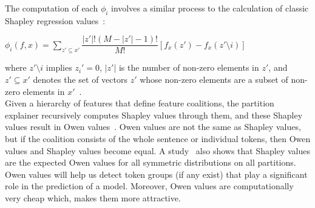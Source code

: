 The computation of each $\phi_i$ involves a similar process to the calculation of classic Shapley regression values~\parencite{AnalysisOfRegressionInGameTheory_Lipovetsky}:
\begin{center}
    $\phi_i(f, x ) = \sum\limits_{z' \subseteq x'} \dfrac{|z'|! (M - |z'| - 1)!}{M!} [f_x(z') - f_x(z' \setminus i)]$
\end{center}
where $z' \setminus i$ implies $z_i' = 0$, $|z'|$ is the number of non-zero elements in $z'$, and $z' \subseteq x'$ denotes the set of vectors $z'$ whose non-zero elements are a subset of non-zero elements in $x'$~\parencite{AUnifiedApproach_Lundberg}.\\
Given a hierarchy of features that define feature coalitions, the partition explainer recursively computes Shapley values through them, and these Shapley values result in Owen values~\parencite{OwenValues_Owen}. Owen values are not the same as Shapley values, but if the coalition consists of the whole sentence or individual tokens, then Owen values and Shapley values become equal. A study~\parencite{TheOwenAndShapleyValue_Casajus} also shows that Shapley values are the expected Owen values for all symmetric distributions on all partitions. Owen values will help us detect token groups (if any exist) that play a significant role in the prediction of a model. Moreover, Owen values are computationally very cheap which, makes them more attractive.\\

